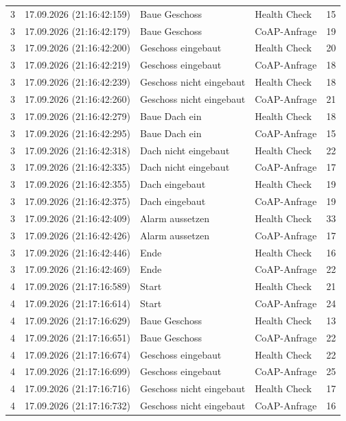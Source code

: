 {\begin{longtable}{|c|l|>{\raggedright\arraybackslash}p{4.2cm}|l|r|}
3 & 17.09.2026 (21:16:42:159) & Baue Geschoss & Health Check & 15 \\
3 & 17.09.2026 (21:16:42:179) & Baue Geschoss & CoAP-Anfrage & 19 \\
3 & 17.09.2026 (21:16:42:200) & Geschoss eingebaut & Health Check & 20 \\
3 & 17.09.2026 (21:16:42:219) & Geschoss eingebaut & CoAP-Anfrage & 18 \\
3 & 17.09.2026 (21:16:42:239) & Geschoss nicht eingebaut & Health Check & 18 \\
3 & 17.09.2026 (21:16:42:260) & Geschoss nicht eingebaut & CoAP-Anfrage & 21 \\
3 & 17.09.2026 (21:16:42:279) & Baue Dach ein & Health Check & 18 \\
3 & 17.09.2026 (21:16:42:295) & Baue Dach ein & CoAP-Anfrage & 15 \\
3 & 17.09.2026 (21:16:42:318) & Dach nicht eingebaut & Health Check & 22 \\
3 & 17.09.2026 (21:16:42:335) & Dach nicht eingebaut & CoAP-Anfrage & 17 \\
3 & 17.09.2026 (21:16:42:355) & Dach eingebaut & Health Check & 19 \\
3 & 17.09.2026 (21:16:42:375) & Dach eingebaut & CoAP-Anfrage & 19 \\
3 & 17.09.2026 (21:16:42:409) & Alarm aussetzen & Health Check & 33 \\
3 & 17.09.2026 (21:16:42:426) & Alarm aussetzen & CoAP-Anfrage & 17 \\
3 & 17.09.2026 (21:16:42:446) & Ende & Health Check & 16 \\
3 & 17.09.2026 (21:16:42:469) & Ende & CoAP-Anfrage & 22 \\
4 & 17.09.2026 (21:17:16:589) & Start & Health Check & 21 \\
4 & 17.09.2026 (21:17:16:614) & Start & CoAP-Anfrage & 24 \\
4 & 17.09.2026 (21:17:16:629) & Baue Geschoss & Health Check & 13 \\
4 & 17.09.2026 (21:17:16:651) & Baue Geschoss & CoAP-Anfrage & 22 \\
4 & 17.09.2026 (21:17:16:674) & Geschoss eingebaut & Health Check & 22 \\
4 & 17.09.2026 (21:17:16:699) & Geschoss eingebaut & CoAP-Anfrage & 25 \\
4 & 17.09.2026 (21:17:16:716) & Geschoss nicht eingebaut & Health Check & 17 \\
4 & 17.09.2026 (21:17:16:732) & Geschoss nicht eingebaut & CoAP-Anfrage & 16 \\

\end{longtable}}
